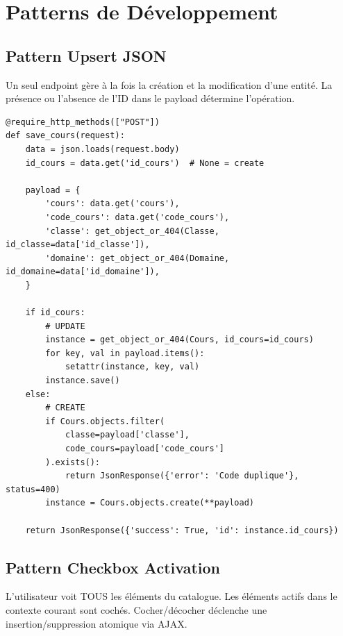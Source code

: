 \documentclass[12pt,a4paper,oneside]{report}
\begin{document}
\chapter{Patterns de Développement}

\section{Pattern Upsert JSON}

\begin{patternbox}
Un seul endpoint gère à la fois la création et la modification d'une entité. La présence ou l'absence de l'ID dans le payload détermine l'opération.
\end{patternbox}

\begin{lstlisting}[style=python, title=Exemple : save\_cours]
@require_http_methods(["POST"])
def save_cours(request):
    data = json.loads(request.body)
    id_cours = data.get('id_cours')  # None = create
    
    payload = {
        'cours': data.get('cours'),
        'code_cours': data.get('code_cours'),
        'classe': get_object_or_404(Classe, id_classe=data['id_classe']),
        'domaine': get_object_or_404(Domaine, id_domaine=data['id_domaine']),
    }
    
    if id_cours:
        # UPDATE
        instance = get_object_or_404(Cours, id_cours=id_cours)
        for key, val in payload.items():
            setattr(instance, key, val)
        instance.save()
    else:
        # CREATE
        if Cours.objects.filter(
            classe=payload['classe'], 
            code_cours=payload['code_cours']
        ).exists():
            return JsonResponse({'error': 'Code duplique'}, status=400)
        instance = Cours.objects.create(**payload)
    
    return JsonResponse({'success': True, 'id': instance.id_cours})
\end{lstlisting}

\section{Pattern Checkbox Activation}

\begin{patternbox}
L'utilisateur voit TOUS les éléments du catalogue. Les éléments actifs dans le contexte courant sont cochés. Cocher/décocher déclenche une insertion/suppression atomique via AJAX.
\end{patternbox}
\end{document}
